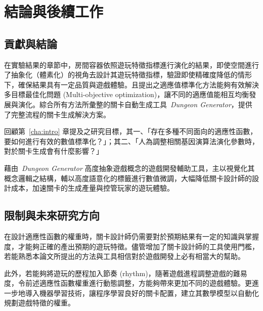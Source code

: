 \chapter{結論與後續工作}
\label{cha:conclusions}

\section{貢獻與結論}

在實驗結果的章節中，房間容器依照遊玩特徵指標進行演化的結果，即使空間進行了抽象化（體素化）的視角去設計其遊玩特徵指標，驗證即使精確度降低的情形下，確保結果具有一定品質與遊戲體驗。且提出之適應值標準化方法能夠有效解決多目標最佳化問題 (Multi-objective optimization)，讓不同的適應值能相互均衡發展與演化。綜合所有方法所彙整的關卡自動生成工具~\textit{Dungeon Generator}，提供了完整流程的關卡生成解決方案。

回顧第~\ref{cha:intro} 章提及之研究目標，其一、「存在多種不同面向的適應性函數，要如何進行有效的數值標準化？」；其二、「人為調整相關基因演算法演化參數時，對於關卡生成會有什麼影響？」

藉由~\textit{Dungeon Generator} 高度抽象遊戲概念的遊戲開發輔助工具，主以視覺化其概念邏輯之結構，輔以高度語意化的標籤進行數值微調，大幅降低關卡設計師的設計成本，加速關卡的生成產量與控管玩家的遊玩體驗。

\section{限制與未來研究方向} 

在設計適應性函數的權重時，關卡設計師仍需要對於預期結果有一定的知識與掌握度，才能夠正確的產出預期的遊玩特徵。儘管增加了關卡設計師的工具使用門檻，若能熟悉本論文所提出的方法與工具相信對於遊戲開發上必有相當大的幫助。

此外，若能夠將遊玩的歷程加入節奏 (rhythm)，隨著遊戲進程調整遊戲的難易度，令前述適應性函數權重進行動態調整，方能夠帶來更加不同的遊戲體驗。更進一步地導入機器學習技術，讓程序學習良好的關卡配置，建立其數學模型以自動化規劃遊戲特徵的權重。